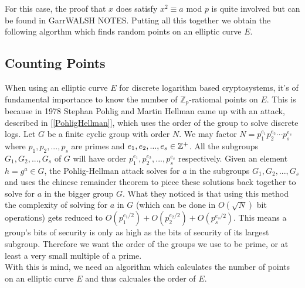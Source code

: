 For this case, the proof that $x$ does satisfy $x^2 \equiv a $ mod $p$ is quite involved but can be found in {\color{red} GarrWALSH NOTES}. Putting all this together we obtain the following algorthm which finds random points on an elliptic curve $E$. \\ 


\subsection{Counting Points}

When using an elliptic curve $E$ for discrete logarithm based cryptosystems, it's of fundamental importance to know the number of $\mathbb{Z}_p$-ratiomal points on $E$. This is because in 1978 Stephan Pohlig and Martin Hellman came up with an attack, described in [\ref{PohligHellman}], which uses the order of the group to solve discrete logs. Let $G$ be a finite cyclic group with order $N$. We may factor $N = p_1^{e_1}p_2^{e_2} \cdots p_s^{e_s}$ where $p_1,p_2,...,p_s$ are primes and $e_1,e_2,...,e_s \in \mathbb{Z}^+ $. All the subgroups $G_1,G_2,...,G_s$ of $G$ will have order $p_1^{e_1},p_2^{e_2},...,p_s^{e_s}$ respectively. Given an element $h = g^a \in G$, the Pohlig-Hellman attack solves for $a$  in the subgroups $G_1,G_2,...,G_s$ and uses the chinese remainder theorem to piece these solutions back together to solve for $a$ in the bigger group $G$. What they noticed is that using this method the complexity of solving for $a$ in $G$ (which can be done in $O(\sqrt{N})$ bit operations) gets reduced to $O(p_1^{e_1/2}) + O(p_2^{e_2/2}) + O(p_s^{e_s/2})$. This means a group's bits of security is only as high as the bits of security of its largest subgroup. Therefore we want the order of the groups we use to be prime, or at least a very small multiple of a prime. \\

With this is mind, we need an algorithm which calculates the number of points on an elliptic curve $E$ and thus calcuales the order of $E$. 



